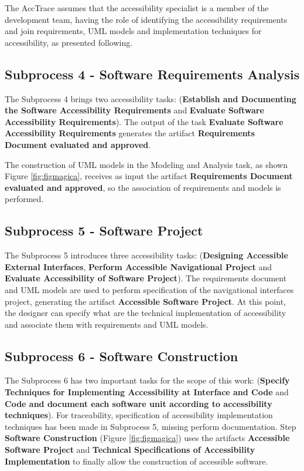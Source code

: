 \documentclass[10pt, conference, compsocconf]{IEEEtran}
\begin{document}
The AccTrace assumes that the accessibility specialist is a member of the development team,
having the role of identifying the
accessibility requirements and join requirements,
UML models and implementation techniques for accessibility, as presented following. 


\subsection{Subprocess 4 - Software Requirements Analysis}

The Subprocess 4 brings two accessibility tasks:  (\textbf{Establish and
Documenting the Software Accessibility Requirements } and \textbf{Evaluate
Software Accessibility Requirements}). The output of the task \textbf{Evaluate
Software Accessibility Requirements} generates the artifact \textbf {Requirements Document  
evaluated and approved}.

The construction of UML models in the Modeling and Analysis task, as shown
Figure \ref{fig:figmagica}, receives as input the artifact \textbf{Requirements Document  
evaluated and approved}, so the association of
requirements and models is performed.

\subsection{Subprocess 5 - Software Project}

The Subprocess 5 introduces three accessibility tasks:  (\textbf{Designing
Accessible External Interfaces}, \textbf{Perform Accessible Navigational Project} and 
\textbf {Evaluate Accessibility of Software Project}). The
requirements document and UML models are used to perform
specification of the navigational interfaces project, generating the artifact
\textbf{Accessible Software Project}. At this point, the designer can specify
what are the technical implementation of accessibility and associate them with
requirements and UML models.


\subsection{Subprocess 6 - Software Construction}

The Subprocess 6 has two important tasks for the scope of this work:
(\textbf{Specify Techniques for Implementing Accessibility
at Interface and Code} and \textbf {Code and document each software unit
according to accessibility techniques}). For traceability,
specification of accessibility implementation techniques has been made in
Subprocess 5, missing perform documentation. Step \textbf{Software Construction} (Figure \ref {fig:figmagica}) uses the
artifacts \textbf{Accessible Software Project} and \textbf{Technical Specifications
of Accessibility Implementation} to finally allow the construction of
accessible software.
\end{document}
